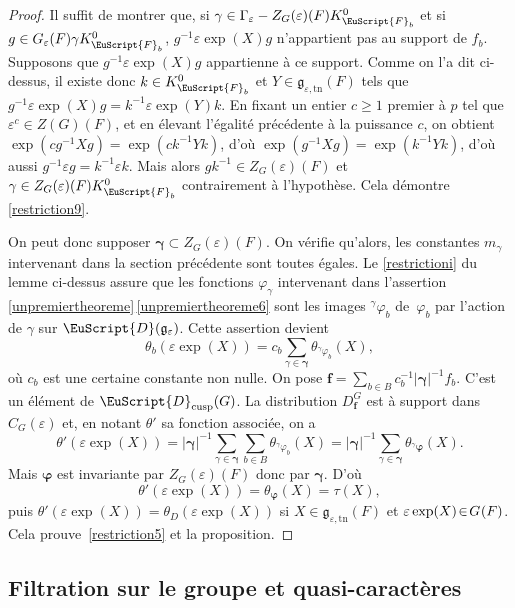 \documentclass[JEP,XML,SOM,Unicode,francais]{cedram}
\let\mathcal \EuScript
\newcommand{\NoChangel}[1]{%
\expandafter\let\csname old\string#1\endcsname=#1
\let#1=\relax
\newcommand{#1}{\mathcode`l="716C\csname old\string#1\endcsname\mathcode`l="7160 }%
}
\let\epsilon\varepsilon
\newcommand{\frg}{\mathfrak{g}}
\newcommand{\cusp}{\mathrm{cusp}}
\newcommand{\rell}{\mathrm{ell}} \NoChangel{\rell}
\newcommand{\tn}{\mathrm{tn}}
\newcommand{\bmf}{\boldsymbol{f}}
\newcommand{\cD}{\mathcal{D}}
\newcommand{\cF}{\mathcal{F}}
\theoremstyle{plain}
\theoremstyle{definition}
\begin{document}
\begin{proof}
Il suffit de montrer que, si $\gamma\in \Gamma_{\epsilon}-Z_{G}(\epsilon)(F)K_{\cF_{b}}^0$ et si $g\in G_{\epsilon}(F)\gamma K_{\cF_{b}}^0$, $g^{-1}\epsilon \exp(X) g$ n'appartient pas au support de $f_{b}$. Supposons que $g^{-1}\epsilon \exp(X) g$ appartienne à ce support. Comme on l'a dit ci-dessus, il existe donc $k\in K_{\cF_{b}}^0$ et $Y\in \frg_{\epsilon,\tn}(F)$ tels que $g^{-1}\epsilon \exp(X)g=k^{-1}\epsilon \exp(Y)k$. En fixant un entier $c\geq1$ premier à $p$ tel que $\epsilon^c\in Z(G)(F)$, et en élevant l'égalité précédente à la puissance $c$, on obtient
$\exp(cg^{-1}Xg)=\exp(ck^{-1}Yk)$, d'où $\exp(g^{-1}Xg)=\exp(k^{-1}Yk)$, d'où aussi $g^{-1}\epsilon g=k^{-1} \epsilon k$. Mais alors $gk^{-1}\in Z_{G}(\epsilon)(F)$ et $\gamma\in Z_{G}(\epsilon)(F)K_{\cF_{b}}^0 $ contrairement à l'hypothèse. Cela démontre \eqref{restriction9}.

On peut donc supposer $\boldsymbol{\gamma}\subset Z_{G}(\epsilon)(F)$. On vérifie qu'alors, les constantes $m_{\gamma}$ intervenant dans la section précédente sont toutes égales. Le \eqref{restrictioni} du lemme ci-dessus assure que les fonctions $\varphi_{\gamma}$ intervenant dans l'assertion \ref{unpremiertheoreme}\,\eqref{unpremiertheoreme6} sont les images $^{\gamma}\varphi_{b}$ de~$\varphi_{b}$ par l'action de $\gamma$ sur $\cD(\frg_{\epsilon})$. Cette assertion
devient
\[
\theta_{b}(\epsilon \exp(X))=c_{b} \sum_{\gamma\in \boldsymbol{\gamma}}
\theta_{^{\gamma}\varphi_{b}}(X),
\]
où $c_{b}$ est une certaine constante non nulle.
On pose $\bmf=\sum_{b\in B}c_{b}^{-1}\vert \boldsymbol{\gamma}\vert^{-1} f_{b}$. C'est un élément de $\cD_{\cusp}(G)$.
La distribution $D^G_{\bmf}$ est à support dans $C_{G}(\epsilon)$ et, en notant $\theta'$ sa fonction associée, on a
\[
\theta'(\epsilon \exp(X))= \vert \boldsymbol{\gamma}\vert ^{-1}\sum_{\gamma\in \boldsymbol{\gamma}}\sum_{b\in B}\theta_{^{\gamma}\varphi_{b}}(X)=\vert \boldsymbol{\gamma}\vert ^{-1}\sum_{\gamma\in \boldsymbol{\gamma}}\theta_{^{\gamma}\boldsymbol{\varphi}}(X).
\]
Mais $\boldsymbol{\varphi}$ est invariante par $Z_{G}(\epsilon)(F)$ donc par $\boldsymbol{\gamma}$. D'où
\[
\theta'(\epsilon \exp(X))=\theta_{\boldsymbol{\varphi}}(X)=\tau(X),
\]
puis $\theta'(\epsilon \exp(X))\!=\!\theta_{D}(\epsilon \exp(X))$ si $X\!\in\!\frg_{\epsilon,\tn}(F)$ et $\epsilon \exp(X)\!\in\!G_{\rell}(F)$. Cela prouve~\eqref{restriction5} et la proposition.
\end{proof}

\subsection{Filtration sur le groupe et quasi-caractères}\label{filtrationsurlegroupe}
\end{document}
